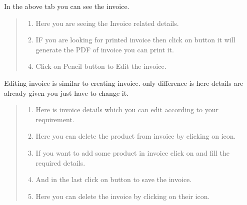 \documentclass[letterpaper,10pt,english]{sphinxmanual}
\begin{document}
\begin{figure}[htbp]
\centering

\noindent{}
\end{figure}

In the above tab you can see the invoice.
\begin{quote}
\begin{enumerate}
\item {} 
Here you are seeing the Invoice related details.

\item {} 
IF you are looking for printed invoice then click on  button it will generate the PDF of invoice you can print it.

\end{enumerate}
\begin{enumerate}
\setcounter{enumi}{3}
\item {} 
Click on Pencil button to Edit the invoice.

\end{enumerate}
\end{quote}

\begin{figure}[htbp]
\centering

\noindent{}
\end{figure}

Editing invoice is similar to creating invoice. only difference is here details are already given you just have to change it.
\begin{quote}
\begin{enumerate}
\item {} 
Here is invoice details which you can edit according to your requirement.

\item {} 
Here you can delete the product from invoice by clicking on  icon.

\item {} 
If you want to add some product in invoice click on \sphinxstylestrong{+} and fill the required details.

\item {} 
And in the last click on  button to save the invoice.

\end{enumerate}
\begin{enumerate}
\setcounter{enumi}{4}
\item {} 
Here you can delete the invoice by clicking on their  icon.

\end{enumerate}
\end{quote}
\end{document}
